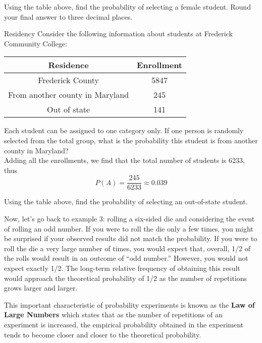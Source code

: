 \begin{try}
Using the table above, find the probability of selecting a female student. Round your final answer to three decimal places.
\end{try}

\begin{example}[https://www.youtube.com/watch?v=odsxeO7wjqk]{Residency}
Consider the following information about students at Frederick Community College:

\begin{center}
\begin{tabular}{|c|c|}
\hline
Residence & Enrollment \\ \hline 
Frederick County & 5847\\ \hline
From another county in Maryland  & 245  \\ \hline 
Out of state & 141 \\ \hline
\end{tabular}
\end{center}

Each student can be assigned to one category only. If one person is randomly selected from the total group, what is the probability this student is from another county in Maryland?  \\

 Adding all the enrollments, we find that the total number of students is 6233, thus
\[  P(A) = \frac{245}{6233} \approx 0.039 \]
\end{example}

\begin{try}
Using the table above, find the probability of selecting an out-of-state student.  
\end{try}  
\vfill
\pagebreak

Now, let's go back to example 3: rolling a six-sided die and considering the event of rolling an odd number. If you were to roll the die only a few times, you might be
surprised if your observed results did not match the probability. If you were to roll the die a very large number of times, you
would expect that, overall, 1/2 of the rolls would result in an outcome of ``odd number.''  However, you would not expect exactly 1/2.  The long-term relative frequency of obtaining this result would approach the theoretical probability of 1/2 as the number of repetitions grows larger and larger. 

This important characteristic of probability experiments is known as the \textbf{Law of Large Numbers} which states that as the number of repetitions of an experiment is increased, the empirical probability obtained in the experiment tends to become closer and closer to the theoretical probability.

